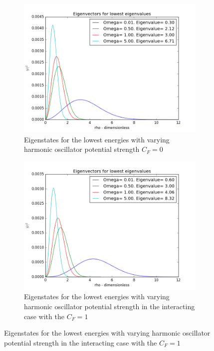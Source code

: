 \documentclass[a4paper,11pt]{article}
\begin{document}
{\begin{figure}
	\centering
	\begin{subfigure}[b]{0.4\textwidth}
		\includegraphics[scale=0.4]{ok_Project_2_Wr=varying_omega}
		\caption{Eigenstates for the lowest energies with varying harmonic oscillator potential strength $C_F = 0$}
		\label{fig:varyingomega}
	\end{subfigure}
	\begin{subfigure}[b]{0.4\textwidth}
		\includegraphics[scale=0.4]{ok_Project_2_Wr=_interaction_varying_omega}
		\caption{Eigenstates for the lowest energies with varying harmonic oscillator potential strength in the interacting case with the $C_F = 1$}
		\label{fig:varyingomegainteracting}
	\end{subfigure}
	

\end{figure}}
\end{document}

